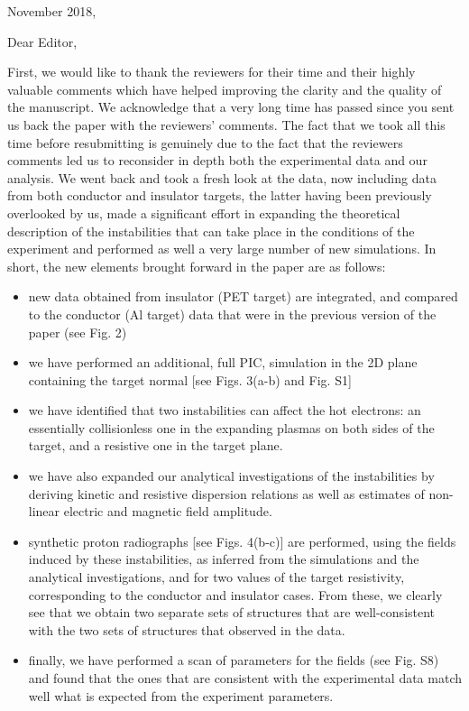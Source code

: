 \documentclass{article}
\begin{document}
November 2018,

Dear Editor,

First, we would like to thank the reviewers for their time and their highly valuable comments which have helped improving the clarity and the quality of the manuscript. We acknowledge that a very long time has passed since you sent us back the paper with the reviewers' comments. 
The fact that we took all this time before resubmitting is genuinely due to the fact that the reviewers comments led us to reconsider in depth both the experimental data and our analysis. We went back and took a fresh look at the data, now including data from both conductor and insulator targets, the latter having been previously overlooked by us, made a significant effort in expanding the theoretical description of the instabilities that can take place in the conditions of the experiment and performed as well a very large number of new simulations. 
In short, the new elements brought forward in the paper are as follows:
\begin{itemize}
    \item new data obtained from insulator (PET target) are integrated, and compared to the conductor (Al target) data that were in the previous version of the paper (see Fig. 2)
    \item we have performed an additional, full PIC, simulation in the 2D plane containing the target normal [see Figs. 3(a-b) and Fig. S1]
    \item we have identified that two instabilities can affect the hot electrons: an essentially  collisionless one in the expanding plasmas on both sides of the target, and a resistive one in the target plane. 
    \item we have also expanded our analytical investigations of the instabilities by deriving kinetic and resistive dispersion relations as well as  estimates of    non-linear electric and magnetic field amplitude.
    \item synthetic proton radiographs [see Figs. 4(b-c)] are performed, using the fields induced by these instabilities, as inferred from the simulations and the analytical investigations, and for two values of the target resistivity, corresponding to the conductor and insulator cases. From these, we clearly see that we obtain two separate sets of structures that are well-consistent with the two sets of structures that observed in the data. 
    \item finally, we have performed a scan of parameters for the fields (see Fig. S8) and found that the ones that are consistent with the experimental data match well what is expected from the experiment parameters. 
\end{itemize}
\end{document}
